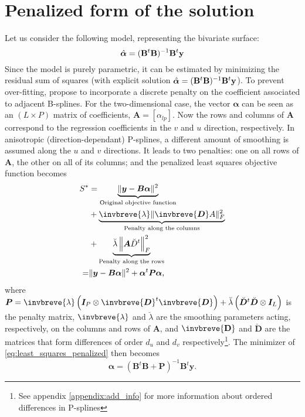 \section{Penalized form of the solution}
\label{appendix:penalized_solution_form}
Let us consider the following model, representing the bivariate surface:
\begin{equation}
	\Hat{\boldsymbol{\alpha}} = (\mathbf{B}^t\mathbf{B})^{-1}\mathbf{B}^t\mathbf{y}
\end{equation}
Since the model is purely parametric, it can be estimated by minimizing the residual sum of squares (with explicit solution $\Hat{\boldsymbol{\alpha}} = (\mathbf{B}^t\mathbf{B})^{-1}\mathbf{B}^t\mathbf{y}$). To prevent over-fitting, \textcite{eilers_flexible_1996} propose to incorporate a discrete penalty on the coefficient associated to adjacent B-splines. For the two-dimensional case, the vector $\boldsymbol{\alpha}$ can be seen as an  $(L \times P)$  matrix  of  coefficients, $\mathbf{A}=[\alpha_{lp}]$. Now the rows  and columns of $\mathbf{A}$ correspond to the regression coefficients in the $v$ and  $u$ direction, respectively. In anisotropic (direction-dependant) P-splines, a different amount of smoothing is assumed along the $u$ and $v$ directions. It leads to two penalties:  one on all rows of $\mathbf{A}$,  the other on all of its columns; and the penalized least squares objective function becomes \parencite{eilers_multivariate_2003}
\begin{equation}
\begin{aligned}
    S^{*} & = \underbrace{\|\boldsymbol{y}-\boldsymbol{B} \boldsymbol{\alpha}\|^{2}}_{\text{Original objective function}} \\
    	  & +\underbrace{\invbreve{\lambda}\|\invbreve{\boldsymbol{D}} A\|_{F}^{2}}_{\text{Penalty along the columns}} \\
    	  & +\underbrace{\breve{\lambda}\left\|\boldsymbol{A} \breve{D}^{t}\right\|_{F}^{2}}_{\text{Penalty along the rows}} \\
    =	  & \|\boldsymbol{y}-\boldsymbol{B} \boldsymbol{\alpha}\|^{2}+\boldsymbol{\alpha}^{t} \boldsymbol{P} \boldsymbol{\alpha}
    \text{,}
    \label{eq:least_squares_penalized}
\end{aligned}
\end{equation}
where $\boldsymbol{P}=\invbreve{\lambda}\left(\boldsymbol{I}_{P} \otimes \invbreve{\boldsymbol{D}}^{t} \invbreve{\boldsymbol{D}}\right)+\breve{\lambda}\left(\breve{\boldsymbol{D}}^{t} \breve{\boldsymbol{D}} \otimes \boldsymbol{I}_{L}\right)$ is the penalty matrix, $\invbreve{\lambda}$ and $\breve{\lambda}$ are the smoothing parameters acting, respectively, on the columns and rows of $\mathbf{A}$, and $\invbreve{\mathbf{D}}$ and $\breve{\mathbf{D}}$ are the matrices that form differences of order $d_u$ and $d_v$ respectively\footnote{See appendix \ref{appendix:add_info} for more information about ordered differences in P-splines}. The minimizer of \ref{eq:least_squares_penalized} then becomes 
\begin{equation}
    \widehat{\boldsymbol{\alpha}}=\left(\boldsymbol{B}^{t} \boldsymbol{B}+\boldsymbol{P}\right)^{-1} \boldsymbol{B}^{t} 
    \boldsymbol{y}
    \text{.}
\end{equation}

